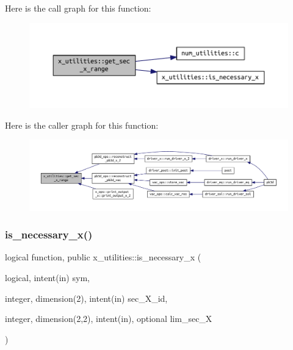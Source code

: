 Here is the call graph for this function\+:
\nopagebreak
\begin{figure}[H]
\begin{center}
\leavevmode
\includegraphics[width=350pt]{namespacex__utilities_a6072ddd1fd230758795ff320c75a1f6a_cgraph}
\end{center}
\end{figure}
Here is the caller graph for this function\+:
\nopagebreak
\begin{figure}[H]
\begin{center}
\leavevmode
\includegraphics[width=350pt]{namespacex__utilities_a6072ddd1fd230758795ff320c75a1f6a_icgraph}
\end{center}
\end{figure}
\mbox{\label{namespacex__utilities_a689aca7fedb49c43c5a65a18d557259f}} 
\subsubsection{\texorpdfstring{is\+\_\+necessary\+\_\+x()}{is\_necessary\_x()}}
{\footnotesize\ttfamily logical function, public x\+\_\+utilities\+::is\+\_\+necessary\+\_\+x (\begin{DoxyParamCaption}\item[{logical, intent(in)}]{sym,  }\item[{integer, dimension(2), intent(in)}]{sec\+\_\+\+X\+\_\+id,  }\item[{integer, dimension(2,2), intent(in), optional}]{lim\+\_\+sec\+\_\+X }\end{DoxyParamCaption})}



